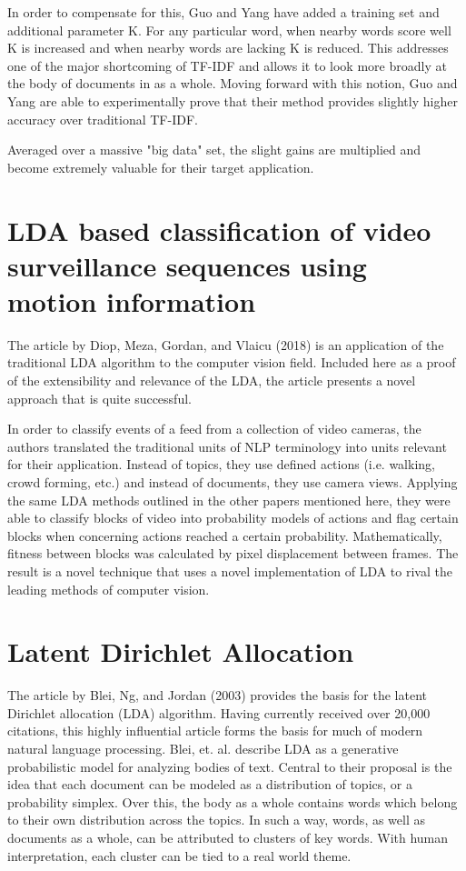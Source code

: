 \documentclass{article}
\begin{document}
In order to compensate for this, Guo and Yang have added a training set and additional parameter K. For any particular word, when nearby words score well K is increased and when nearby words are lacking K is reduced. This addresses one of the major shortcoming of TF-IDF and allows it to look more broadly at the body of documents in as a whole. Moving forward with this notion, Guo and Yang are able to experimentally prove that their method provides slightly higher accuracy over traditional TF-IDF.

Averaged over a massive "big data" set, the slight gains are multiplied and become extremely valuable for their target application.

\section{LDA based classification of video surveillance sequences using motion information}

The article by Diop, Meza, Gordan, and Vlaicu (2018) is an application of the traditional LDA algorithm to the computer vision field. Included here as a proof of the extensibility and relevance of the LDA, the article presents a novel approach that is quite successful.

In order to classify events of a feed from a collection of video cameras, the authors translated the traditional units of NLP terminology into units relevant for their application. Instead of topics, they use defined actions (i.e.  walking, crowd forming, etc.) and instead of documents, they use camera views. Applying the same LDA methods outlined in the other papers mentioned here, they were able to classify blocks of video into probability models of actions and flag certain blocks when concerning actions reached a certain probability. Mathematically, fitness between blocks was calculated by pixel displacement between frames. The result is a novel technique that uses a novel implementation of LDA to rival the leading methods of computer vision. 

\section{Latent Dirichlet Allocation}

The article by Blei, Ng, and Jordan (2003) \cite{blei2003latent} provides the basis for the latent Dirichlet allocation (LDA) algorithm. Having currently received over 20,000 citations, this highly influential article forms the basis for much of modern natural language processing. Blei, et. al. describe LDA as a generative probabilistic model for analyzing bodies of text. Central to their proposal is the idea that each document can be modeled as a distribution of topics, or a probability simplex. Over this, the body as a whole contains words which belong to their own distribution across the topics. In such a way, words, as well as documents as a whole, can be attributed to clusters of key words. With human interpretation, each cluster can be tied to a real world theme. 
\end{document}
